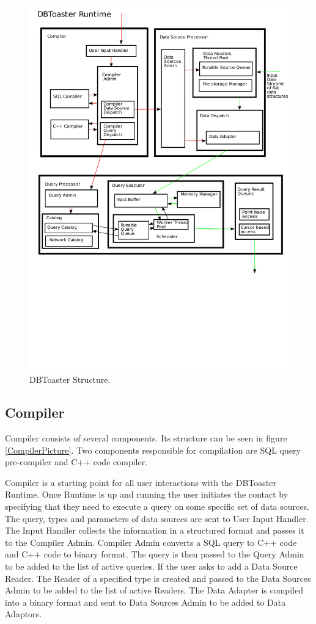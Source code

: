 \documentclass[11pt]{article}
\begin{document}
\begin{figure}
  \includegraphics[width=4.50in]{../figures/DBToasterRuntime.pdf}
  \caption{DBToaster Structure.}
  \label{DBToasterPic}
\end{figure}



\subsection{Compiler}

Compiler consists of several components. Its structure can be seen in figure \ref{CompilerPicture}. Two components responsible for compilation are SQL query pre-compiler and C++ code compiler. 

Compiler is a starting point for all user interactions with the DBToaster Runtime. Once Runtime is up and running the user initiates the contact by specifying that they need to execute a query on some specific set of data sources. The query, types and parameters of data sources are sent to User Input Handler. The Input Handler collects the information in a structured format and passes it to the Compiler Admin. Compiler Admin converts a SQL query to C++ code and C++ code to binary format. The query is then passed to the Query Admin to be added to the list of active queries. If the user asks to add a Data Source Reader. The Reader of a specified type is created and passed to the Data Sources Admin to be added to the list of active Readers. The Data Adapter is compiled into a binary format and sent to Data Sources Admin to be added to Data Adaptors. 
\end{document}
